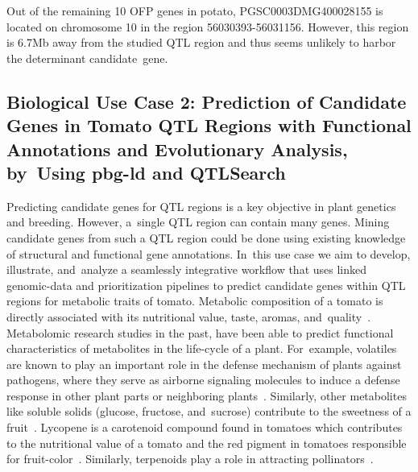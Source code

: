 \documentclass[applsci,article,accept,moreauthors,pdftex]{Definitions/mdpi}
\begin{document}
{Out of the remaining 10 OFP genes in potato, PGSC0003DMG400028155 is located on chromosome 10 in the region 56030393-56031156. However, this region is 6.7Mb away from the studied QTL region and thus seems unlikely to harbor the  determinant candidate~gene. 

\subsection{Biological Use Case 2: Prediction of Candidate Genes in Tomato QTL Regions with Functional Annotations and Evolutionary Analysis, by~Using pbg-ld and QTLSearch}

Predicting candidate genes for QTL regions is a key objective in plant genetics and breeding. However, a~single QTL region can contain many genes. Mining candidate genes from such a QTL region could be done using existing knowledge of structural and functional gene annotations. In~this use case we aim to develop, illustrate, and~analyze a seamlessly integrative workflow that uses linked genomic-data and prioritization pipelines to predict candidate genes within QTL regions for metabolic traits of tomato. Metabolic composition of a tomato is directly associated with its nutritional value, taste, aromas, and~quality~\cite{ballester2016identification}. Metabolomic research studies in the past, have been able to predict functional characteristics of metabolites in the life-cycle of a plant. For~example, volatiles are known to play an important role in the defense mechanism of plants against pathogens, where they serve as airborne signaling molecules to induce a defense response in other plant parts or neighboring plants~\cite{shulaev1997airborne}. Similarly, other metabolites like soluble solids (glucose, fructose, and~sucrose) contribute to the sweetness of a fruit~\cite{luengwilai2010comparison}. Lycopene is a carotenoid compound found in tomatoes which contributes to the nutritional value of a tomato and the red pigment in tomatoes responsible for fruit-color~\cite{di1989lycopene}. Similarly, terpenoids play a role in attracting pollinators~\cite{falara2011tomato}.

}
\end{document}
